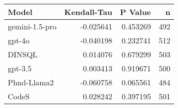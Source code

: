 \begin{tabular}{lrrr}
\toprule
Model & Kendall-Tau & P Value & n \\
\midrule
gemini-1.5-pro & -0.025641 & 0.453269 & 492 \\
gpt-4o & -0.040198 & 0.232741 & 512 \\
DINSQL & 0.014076 & 0.679299 & 503 \\
gpt-3.5 & 0.003413 & 0.919671 & 500 \\
Phnd-Llama2 & -0.060758 & 0.065561 & 484 \\
CodeS & 0.028242 & 0.397195 & 501 \\
\bottomrule
\end{tabular}
